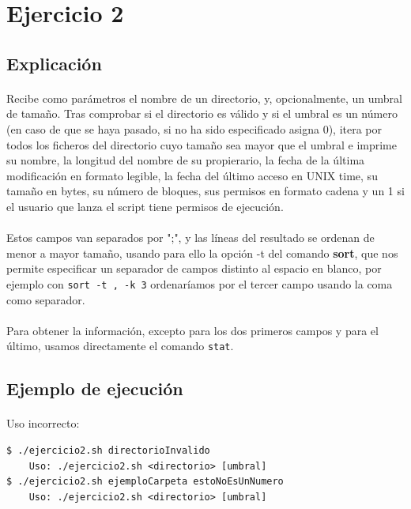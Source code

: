\documentclass[12pt,a4paper]{article}
\begin{document}
\pagebreak
\section{Ejercicio 2}
\subsection{Explicación}
\paragraph{}
Recibe como parámetros el nombre de un directorio, y, opcionalmente, un umbral de tamaño. Tras comprobar si el directorio es válido y si el umbral es un número (en caso de que se haya pasado, si no ha sido especificado asigna 0), itera por todos los ficheros del directorio cuyo tamaño sea mayor que el umbral e imprime su nombre, la longitud del nombre de su propierario, la fecha de la última modificación en formato legible, la fecha del último acceso en UNIX time, su tamaño en bytes, su número de bloques, sus permisos en formato cadena y un 1 si el usuario que lanza el script tiene permisos de ejecución. 
\paragraph{}
Estos campos van separados por ";", y las líneas del resultado se ordenan de menor a mayor tamaño, usando para ello la opción -t del comando \textbf{sort}, que nos permite especificar un separador de campos distinto al espacio en blanco, por ejemplo con  \texttt{sort -t , -k 3} ordenaríamos por el tercer campo usando la coma como separador.
\paragraph{}
Para obtener la información, excepto para los dos primeros campos y para el último, usamos directamente el comando \texttt{stat}.
\subsection{Ejemplo de ejecución}

\paragraph{}
Uso incorrecto:
\begin{lstlisting}[basicstyle=\ttfamily\scriptsize]
$ ./ejercicio2.sh directorioInvalido
	Uso: ./ejercicio2.sh <directorio> [umbral]
$ ./ejercicio2.sh ejemploCarpeta estoNoEsUnNumero
	Uso: ./ejercicio2.sh <directorio> [umbral]
\end{lstlisting}
\end{document}
